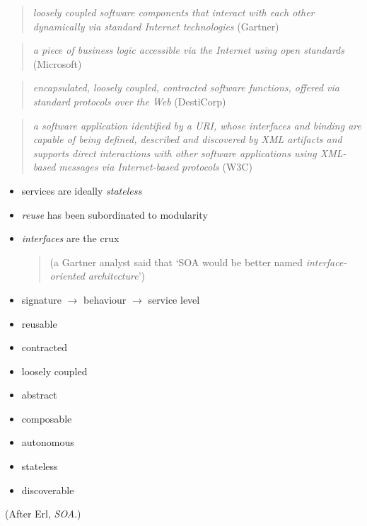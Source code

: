 \documentclass{sepslide-soa-faked} %
\begin{document}
\begin{slide}
\begin{quote}
\emph{loosely coupled software components that interact with each other dynamically via standard Internet technologies}
(Gartner)
\end{quote}
\begin{quote}
\emph{a piece of business logic accessible via the Internet using open standards}
(Microsoft)
\end{quote}
\begin{quote}
\emph{encapsulated, loosely coupled, contracted software functions, offered via standard protocols over the Web}
(DestiCorp)
\end{quote}
\begin{quote}
\emph{a software application identified by a URI, whose interfaces and binding are capable of being defined, described and discovered by XML artifacts and supports direct interactions with other software applications using XML-based messages via Internet-based protocols}
(W3C)
\end{quote}
\end{slide}

\begin{slide}
\begin{itemize}
\item services are ideally \emph{stateless}
\item \emph{reuse} has been subordinated to modularity
\item \emph{interfaces} are the crux 
\begin{quote} (a Gartner analyst said that `SOA would be better named \emph{interface-oriented architecture}') \end{quote}
\item signature $\to$ behaviour $\to$ service level
\end{itemize}
\end{slide}

\begin{slide}
\begin{itemize}
\item reusable
\item contracted
\item loosely coupled
\item abstract
\item composable
\item autonomous
\item stateless
\item discoverable
\end{itemize}
(After Erl, \textit{SOA}.)
\end{slide}
\end{document}
